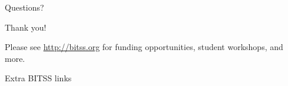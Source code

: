 \documentclass{beamer}
\begin{document}
{ %
    \begin{frame}[plain]
     \end{frame}
}

\begin{frame}
\begin{center}
Questions?
\vspace{1in}

\begin{Huge}Thank you!\end{Huge}

\vspace{0.5in}
Please see \url{http://bitss.org} for funding opportunities, student workshops, and more.

\end{center}
\end{frame}
\begin{frame}
Extra BITSS links
\end{frame}
\end{document}
